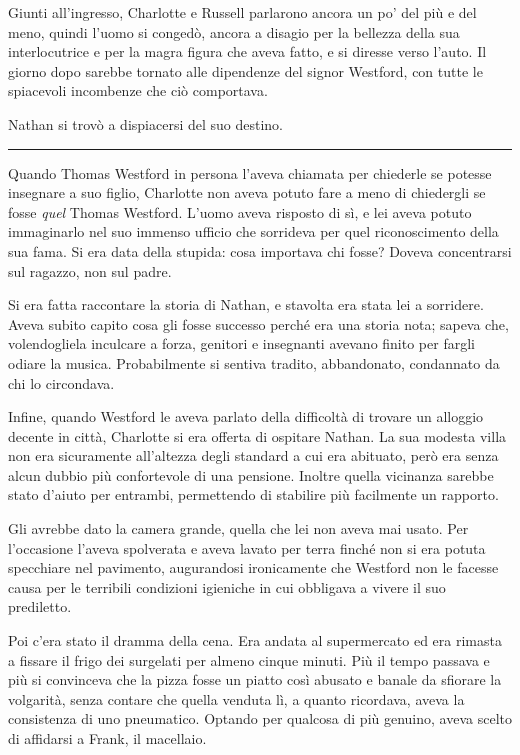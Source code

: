 \documentclass[a4paper,oneside,11pt]{memoir}
\begin{document}
Giunti all'ingresso, Charlotte e Russell parlarono ancora un po' del più e del meno, quindi l'uomo si congedò, ancora
a disagio per la bellezza della sua interlocutrice e per la magra figura che aveva fatto, e si diresse verso l'auto. Il
giorno dopo sarebbe tornato alle dipendenze del signor Westford, con tutte le spiacevoli incombenze che ciò comportava.

Nathan si trovò a dispiacersi del suo destino.

\plainbreak{1}

Quando Thomas Westford in persona l'aveva chiamata per chiederle se potesse insegnare a suo figlio, Charlotte non aveva
potuto fare a meno di chiedergli se fosse \emph{quel} Thomas Westford. L'uomo aveva risposto di sì, e lei aveva potuto
immaginarlo nel suo immenso ufficio che sorrideva per quel riconoscimento della sua fama. Si era data della stupida:
cosa importava chi fosse? Doveva concentrarsi sul ragazzo, non sul padre.

Si era fatta raccontare la storia di Nathan, e stavolta era stata lei a sorridere. Aveva subito capito cosa gli fosse
successo perché era una storia nota; sapeva che, volendogliela inculcare a forza, genitori e insegnanti avevano finito
per fargli odiare la musica. Probabilmente si sentiva tradito, abbandonato, condannato da chi lo circondava.

Infine, quando Westford le aveva parlato della difficoltà di trovare un alloggio decente in città, Charlotte si era
offerta di ospitare Nathan. La sua modesta villa non era sicuramente all'altezza degli standard a cui era abituato,
però era senza alcun dubbio più confortevole di una pensione. Inoltre quella vicinanza sarebbe stato d'aiuto per
entrambi, permettendo di stabilire più facilmente un rapporto.

Gli avrebbe dato la camera grande, quella che lei non aveva mai usato. Per l'occasione l'aveva spolverata e aveva lavato
per terra finché non si era potuta specchiare nel pavimento, augurandosi ironicamente che Westford non le facesse causa
per le terribili condizioni igieniche in cui obbligava a vivere il suo prediletto.

Poi c'era stato il dramma della cena. Era andata al supermercato ed era rimasta a fissare il frigo dei surgelati per
almeno cinque minuti. Più il tempo passava e più si convinceva che la pizza fosse un piatto così abusato e banale da
sfiorare la volgarità, senza contare che quella venduta lì, a quanto ricordava, aveva la consistenza di uno pneumatico.
Optando per qualcosa di più genuino, aveva scelto di affidarsi a Frank, il macellaio.
\end{document}
